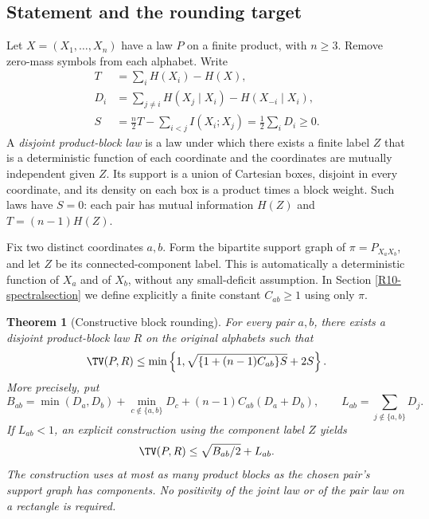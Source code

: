 \documentclass[11pt,a4paper]{article}
\newtheorem{theorem}{Theorem}[section]
\theoremstyle{definition}\newtheorem{definition}[theorem]{Definition}
\theoremstyle{remark}\newtheorem{remark}[theorem]{Remark}
\numberwithin{equation}{section}
\begin{document}
\subsection{Statement and the rounding target}\label{R10-sec-1}
Let $X=(X_1,\ldots,X_n)$ have a law $P$ on a finite product, with $n\ge3$. Remove zero-mass symbols from each alphabet. Write
\begin{align*}
 T&=\sum_iH(X_i)-H(X),\\
 D_i&=\sum_{j\ne i}H(X_j\mid X_i)-H(X_{-i}\mid X_i),\\
 S&=\frac n2T-\sum_{i<j}I(X_i;X_j)=\frac12\sum_iD_i\ge0.
\end{align*}
A \emph{disjoint product-block law} is a law under which there exists a finite label $Z$ that is a deterministic function of each coordinate and the coordinates are mutually independent given $Z$. Its support is a union of Cartesian boxes, disjoint in every coordinate, and its density on each box is a product times a block weight. Such laws have $S=0$: each pair has mutual information $H(Z)$ and $T=(n-1)H(Z)$.

Fix two distinct coordinates $a,b$. Form the bipartite support graph of $\pi=P_{X_aX_b}$, and let $Z$ be its connected-component label. This is automatically a deterministic function of $X_a$ and of $X_b$, without any small-deficit assumption. In Section \ref{R10-spectralsection} we define explicitly a finite constant $C_{ab}\ge1$ using only $\pi$.

\begin{theorem}[Constructive block rounding]\label{R10-main}
For every pair $a,b$, there exists a disjoint product-block law $R$ on the original alphabets such that
\begin{equation}\label{R10-simple}
 \TV(P,R)\le\min\left\{1,\sqrt{\{1+(n-1)C_{ab}\}S}+2S\right\}.
\end{equation}
More precisely, put
\begin{equation}\label{R10-BL}
 B_{ab}=\min(D_a,D_b)+\min_{c\notin\{a,b\}}D_c
 +(n-1)C_{ab}(D_a+D_b),\qquad
 L_{ab}=\sum_{j\notin\{a,b\}}D_j.
\end{equation}
If $L_{ab}<1$, an explicit construction using the component label $Z$ yields
\begin{equation}\label{R10-refined}
 \TV(P,R)\le \sqrt{B_{ab}/2}+L_{ab}.
\end{equation}
The construction uses at most as many product blocks as the chosen pair's support graph has components. No positivity of the joint law or of the pair law on a rectangle is required.
\end{theorem}
\end{document}
